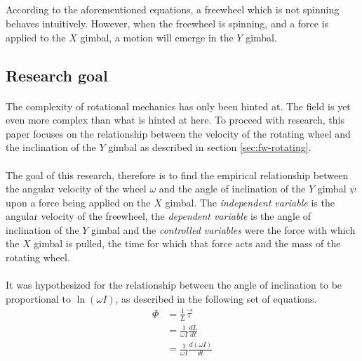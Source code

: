 \documentclass[a4paper]{article}
\begin{document}
\subsection*{}

\paragraph*{}
According to the aforementioned equations, a freewheel which is not spinning
behaves intuitively. However, when the freewheel is spinning, and a force is
applied to the $X$ gimbal, a motion will emerge in the $Y$ gimbal.

\subsection{Research goal}

\paragraph*{}
The complexity of rotational mechanics has only been hinted at. The field is
yet even more complex than what is hinted at here. To proceed with research,
this paper focuses on the relationship between the velocity of the rotating
wheel and the inclination of the $Y$ gimbal as described in section
\ref{sec:fw-rotating}.

\paragraph*{}
The goal of this research, therefore is to find the empirical relationship
between the angular velocity of the wheel $\omega$ and the angle of inclination of the
$Y$ gimbal $\psi$ upon a force being applied on the $X$ gimbal. The
\textit{independent variable} is the angular velocity of the freewheel, the
\textit{dependent variable} is the angle of inclination of the $Y$ gimbal and
the \textit{controlled variables} were the force with which the $X$ gimbal is
pulled, the time for which that force acts and the mass of the rotating wheel.

\paragraph*{}
It was hypothesized for the relationship between the angle of inclination to be
proportional to $\ln (\omega I)$, as described in the
following set of equations.
\begin{align*}
  \Phi &= \frac{1}{L} \vec{\tau} \\
  &= \frac{1}{\omega I} \frac{dL}{dt} \\
  &= \frac{1}{\omega I} \frac{d(\omega I)}{dt}
\end{align*}
\end{document}
